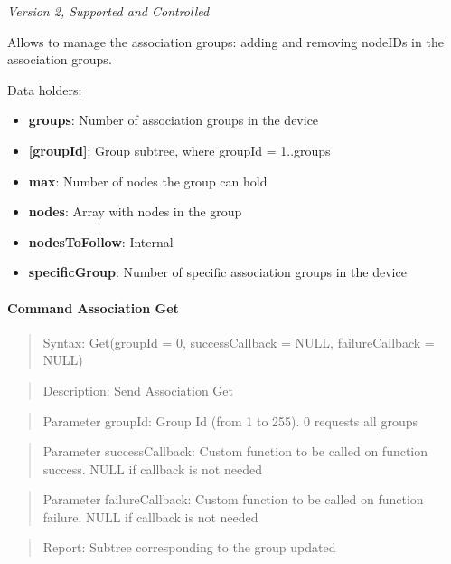 \textit{Version 2, Supported and Controlled}
\newline

Allows to manage the association groups: adding and removing nodeIDs in the association groups.
\newline

\noindent
Data holders:

\begin{itemize}
\item \textbf{groups}: Number of association groups in the device
\item \textbf{[groupId]}: Group subtree, where groupId = 1..groups
\item \qquad\textbf{max}: Number of nodes the group can hold
\item \qquad\textbf{nodes}: Array with nodes in the group
\item \qquad\textbf{nodesToFollow}: Internal
\item \textbf{specificGroup}: Number of specific association groups in the device
\end{itemize}

\paragraph{Command Association Get}
\begin{quote}Syntax: Get(groupId = 0, successCallback = NULL, failureCallback = NULL)\end{quote}
\begin{quote}Description: Send Association Get\end{quote}
\begin{quote}Parameter groupId: Group Id (from 1 to 255). 0 requests all groups\end{quote}
\begin{quote}Parameter successCallback: Custom function to be called on function success. NULL if callback is not needed\end{quote}
\begin{quote}Parameter failureCallback: Custom function to be called on function failure. NULL if callback is not needed\end{quote}
\begin{quote}Report: Subtree corresponding to the group updated\end{quote}

